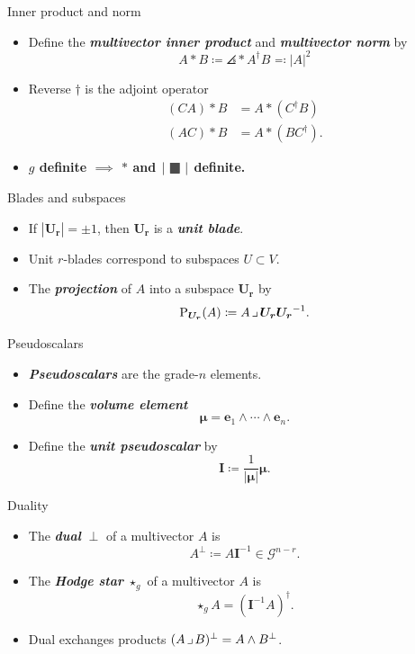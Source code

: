 \documentclass[aspectratio=169,handout]{beamer}
\makeatletter
\newcommand\boldgreen[1]{\textcolor{lighter_csu_green}{\emph{\textbf{#1}}}}
\newcommand\boldgold[1]{\textcolor{csu_gold}{\textbf{#1}}}
\newcommand{\G}{\mathcal{G}}
\newcommand{\projection}{\operatorname{P}}
\newcommand{\blade}[1]{\boldsymbol{#1}}
\newcommand{\pseudoscalar}{\blade{I}}
\newcommand{\contract}{\hspace*{.5mm} \lrcorner \hspace*{.5mm}}
\DeclarePairedDelimiter\angles{\langle}{\rangle}
\newcommand{\proj}[2]{\angles*{#2}_{#1}}
\def\mathcolor#1#{\@mathcolor{#1}}
\def\@mathcolor#1#2#3{%
  \protect\leavevmode
  \begingroup
    \color#1{#2}#3%
  \endgroup
}
\newcommand{\blank}{\raisebox{-.3ex}{\mathcolor{light-gray}{\text{\large$\blacksquare$}}}}
\makeatother
\begin{document}
\begin{frame}{Inner product and norm}
\vfill
\begin{itemize}
\pause
\item Define the \boldgreen{multivector inner product} and \boldgreen{multivector norm} by
\[
A \ast B \coloneqq \proj{}{A^\dagger B} \eqqcolon |A|^2
\]
\pause
\item Reverse $\dagger$ is the adjoint operator
\begin{align*}
(CA) \ast B &= A \ast (C^\dagger B)\\
(AC) \ast B &= A \ast (BC^\dagger).
\end{align*}
\pause
\item \boldgold{$g$ definite $\implies$ $\ast$ and $|\blank|$ definite.}
\end{itemize}
\vfill
\end{frame}

\begin{frame}{Blades and subspaces}
\vfill
\begin{itemize}
\pause
\item If $|\blade{U_r}|=\pm 1$, then $\blade{U_r}$ is a \boldgreen{unit blade}.
\pause
\item Unit $r$-blades correspond to subspaces $U\subset V$.
\pause
\item The \boldgreen{projection} of $A$ into a subspace $\blade{U_r}$ by
\[
\projection_{\blade{U_r}} (A) \coloneqq A\contract \blade{U_r}\blade{U_r}^{-1}.
\]
\end{itemize}
\vfill
\end{frame}

\begin{frame}{Pseudoscalars}
\vfill
\begin{itemize}
\pause
\item \boldgreen{Pseudoscalars} are the grade-$n$ elements.
\pause
\item Define the \boldgreen{volume element}
\[
\blade{\mu} = \blade{e}_1 \wedge \cdots \wedge \blade{e}_n.
\]
\pause
\item Define the \boldgreen{unit pseudoscalar} by
\[
\pseudoscalar \coloneqq \frac{1}{|\blade{\mu}|} \blade{\mu}.
\]
\end{itemize}
\vfill
\end{frame}

\begin{frame}{Duality}
\vfill
\begin{itemize}
\pause
\item The \boldgreen{dual} \boldgold{$\perp$} of a multivector $A$ is
\[
A^\perp \coloneqq A \pseudoscalar^{-1} \in \G^{n-r}.
\]
\pause
\item The \boldgreen{Hodge star} \boldgold{$\star_g$} of a multivector $A$ is
\[
\star_g A = (\pseudoscalar^{-1}A)^\dagger.
\]
\pause
\item Dual exchanges products $(A \contract B)^\perp = A \wedge B^\perp$.
\end{itemize}
\vfill
\end{frame}
\end{document}
